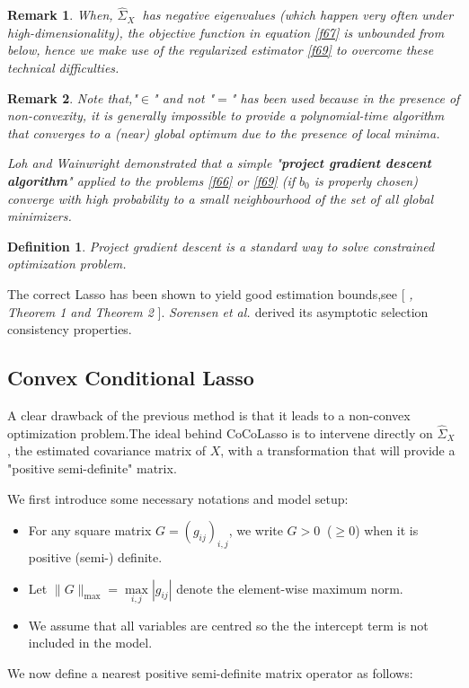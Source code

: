 \documentclass[12pt]{report}
\newtheorem {definition}{Definition}[section] %
\newtheorem{remarque}{Remark}[section]
\begin{document}
\begin{remarque}
	When, $\hat{\Sigma}_{X}\ $  has negative eigenvalues (which happen very often under high-dimensionality), the objective function in equation \eqref{f67} is unbounded from below, hence we make use of the regularized estimator \eqref{f69} to overcome these technical  difficulties.
\end{remarque}

\begin{remarque}
Note that,"$\in$" and not "$=$" has been used because in the presence of non-convexity, it is generally impossible to provide a polynomial-time algorithm that converges to a (near) global optimum due to the presence of local minima.

\textit{Loh and Wainwright \cite{nref13}} demonstrated that a simple "\textbf{project gradient descent algorithm}" applied to the problems \eqref{f66} or \eqref{f69} (if $b_{0}$ is properly chosen) converge with high probability to a small neighbourhood of the set of all global minimizers.
\end{remarque}
\begin{definition}
	Project gradient descent is a standard way to solve constrained optimization problem.
\end{definition}

The correct Lasso has been shown to yield good estimation bounds,see [\textit{ \cite{nref17}, Theorem 1 and Theorem 2} ]. \textit{Sorensen et al. \cite{nref17}} derived its asymptotic selection consistency properties.

\subsection{Convex Conditional Lasso}
A clear drawback of the previous method is that it leads to a non-convex optimization problem.The ideal behind CoCoLasso is to intervene directly on $\hat{\Sigma}_{X}\ $, the estimated covariance matrix of $X$, with a transformation that will provide a "positive semi-definite" matrix.

We first introduce some necessary notations and model setup:
\begin{itemize}
	\item For any square matrix $G=(g_{ij})_{i,j}$, we write $G>0\ $ ($\geq$0) when it is positive (semi-) definite.
	\item Let $\parallel G\parallel_{\max}=\underset{i,j}{\max}|g_{ij}|$ denote the element-wise maximum norm.
	\item We assume that all variables are centred so the the intercept term is not included in the model.
\end{itemize}
We now define a nearest positive semi-definite matrix operator as follows:
\end{document}
